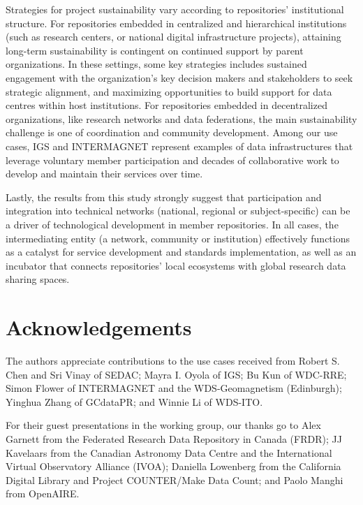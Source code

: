 \documentclass{interact}
\begin{document}
Strategies for project sustainability vary according to repositories' institutional structure. For repositories embedded in centralized and hierarchical institutions (such as research centers, or national digital infrastructure projects), attaining long-term sustainability is contingent on continued support by parent organizations. In these settings, some key strategies includes sustained engagement with the organization's key decision makers and stakeholders to seek strategic alignment, and maximizing opportunities to build support for data centres within host institutions. For repositories embedded in decentralized organizations, like research networks and data federations, the main sustainability challenge is one of coordination and community development. Among our use cases, IGS and INTERMAGNET represent examples of data infrastructures that leverage voluntary member participation and decades of collaborative work to develop and maintain their services over time.

Lastly, the results from this study strongly suggest that participation and integration into technical networks (national, regional or subject-specific) can be a driver of technological development in member repositories. In all cases, the intermediating entity (a network, community or institution) effectively functions as a catalyst for service development and standards implementation, as well as an incubator that connects repositories' local ecosystems with global research data sharing spaces.

\section*{Acknowledgements}\label{acknowledgment}
The authors appreciate contributions to the use cases received from Robert S. Chen and Sri Vinay of SEDAC; Mayra I. Oyola of IGS; Bu Kun of WDC-RRE; Simon Flower of INTERMAGNET and the WDS-Geomagnetism (Edinburgh); Yinghua Zhang of GCdataPR; and Winnie Li of WDS-ITO.

For their guest presentations in the working group, our thanks go to Alex Garnett from the Federated Research Data Repository in Canada (FRDR); JJ Kavelaars from the Canadian Astronomy Data Centre and the International Virtual Observatory Alliance (IVOA); Daniella Lowenberg from the California Digital Library and Project COUNTER/Make Data Count; and Paolo Manghi from OpenAIRE.
\end{document}
